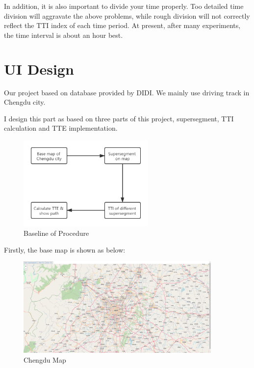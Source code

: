 \documentclass[fontset=none]{ctexart}
\theoremstyle{definition}
\theoremstyle{remark}
\begin{document}
In addition, it is also important to divide your time properly. Too detailed time division will aggravate the above problems, while rough division will not correctly reflect the TTI index of each time period. At present, after many experiments, the time interval is about an hour best.

\clearpage
\section{UI Design}

      Our project based on database provided by DIDI. We mainly use driving track in Chengdu city. 
      
      I design this part as based on three parts of this project, supersegment, TTI calculation and TTE implementation.

      \begin{figure}[H]
          \centering
          \includegraphics[width=0.6\textwidth]{images/baseline.png}
          \newline
          \caption{Baseline of Procedure}
      \end{figure}
      
      Firstly, the base map is shown as below:

      \begin{figure}[H]
          \centering
          \includegraphics[width=0.9\textwidth]{images/Initial.jpg}
          \newline
          \caption{Chengdu Map}
      \end{figure}
\end{document}
